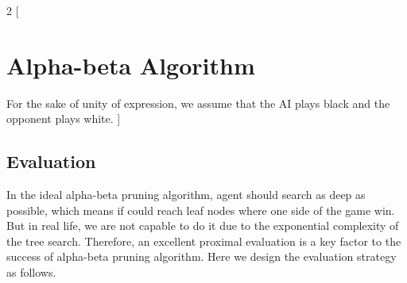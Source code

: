 \documentclass[a4paper, 12pt]{article} %
\begin{document}
\begin{multicols}{2}
  [
      \section{Alpha-beta Algorithm}
      For the sake of unity of expression, we assume that the AI plays black and the opponent plays white.
  ]
  \subsection{Evaluation}
  In the ideal alpha-beta pruning algorithm, agent should search as deep as possible, which means if could reach leaf nodes where one side of the game win. But in real life, we are not capable to do it due to the exponential complexity of the tree search. Therefore, an excellent proximal evaluation is a key factor to the success of alpha-beta pruning algorithm. Here we design the evaluation strategy as follows.
  

\end{multicols}
\end{document}

